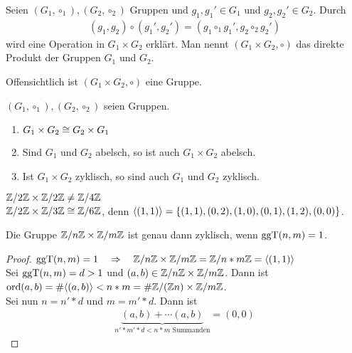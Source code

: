 \begin{defin}
	Seien $(G_1,\circ_1), (G_2, \circ_2)$ Gruppen und $g_1, g_1' \in G_1$ und $g_2 , g_2' \in G_2$. Durch 
	\begin{align*}
	(g_1,g_2) \circ (g_1',g_2') = (g_1 \circ_1 g_1' , g_2 \circ_2 g_2')
	\end{align*}
	wird eine Operation in $G_1 \times G_2$ erklärt. Man nennt $(G_1 \times G_2 , \circ)$ das direkte Produkt der Gruppen $G_1$ und $G_2$.
\end{defin}
\begin{bem}
	Offensichtlich ist $(G_1 \times G_2 , \circ)$ eine Gruppe.
\end{bem}
%
\begin{satz}
	$(G_1, \circ_1), (G_2 , \circ_2)$ seien Gruppen.
	\begin{enumerate}
		\item $G_1 \times G_2 \cong G_2 \times G_1$
		\item Sind $G_1$ und $G_2$ abelsch, so ist auch $G_1 \times G_2$ abelsch.
		\item Ist $G_1 \times G_2$ zyklisch, so sind auch $G_1$ und $G_2$ zyklisch.
	\end{enumerate}
\end{satz}

\begin{bsp}
	$\mathbb{Z} / 2 \mathbb{Z} \times \mathbb{Z} / 2 \mathbb{Z} \neq \mathbb{Z} / 4 \mathbb{Z}$ \\
	$\mathbb{Z} / 2 \mathbb{Z} \times \mathbb{Z} / 3 \mathbb{Z} \cong \mathbb{Z} / 6 \mathbb{Z}$, denn $\langle (1,1) \rangle = \{ (1,1) , (0,2) , (1,0) , (0,1) ,(1,2) , (0,0) \}$.
\end{bsp}

\begin{satz}
	Die Gruppe $\mathbb{Z} / n \mathbb{Z} \times \mathbb{Z} / m \mathbb{Z}$ ist genau dann zyklisch, wenn $\operatorname{ggT}(n,m) = 1$.
\end{satz}
\begin{proof}
	$\operatorname{ggT}(n,m)=1 \quad \Rightarrow \quad \mathbb{Z} / n \mathbb{Z} \times \mathbb{Z} / m \mathbb{Z} = \mathbb{Z} / n*m \mathbb{Z} = \langle (1,1) \rangle$ \\
	Sei $\operatorname{ggT}(n,m) = d > 1$ und $(a,b) \in \mathbb{Z} / n \mathbb{Z} \times \mathbb{Z} / m \mathbb{Z}$. Dann ist $\operatorname{ord}(a,b) = \# \langle (a,b) \rangle < n*m = \# \mathbb{Z} / ( \mathbb{Z} n) \times \mathbb{Z} / m \mathbb{Z}$. \\
	Sei nun $n=n' * d$ und $m=m' * d$. Dann ist
	\begin{align*}
	\underbrace{(a,b) + \cdots (a,b)}_{n'*m'*d < n*m \text{ Summanden}} = (0,0)
	\end{align*}
\end{proof}

